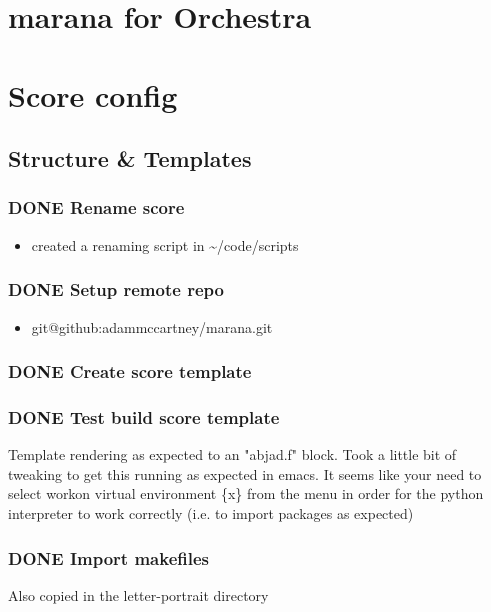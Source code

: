 \documentclass[11pt]{article}
\author{adam}
\date{\today}
\title{}
\begin{document}
\tableofcontents

\section{marana for Orchestra}
\label{sec:org8f78d0e}

\section{Score config}
\label{sec:org388cfac}

\subsection{Structure \& Templates}
\label{sec:org8746cfe}
\subsubsection{{\bfseries\sffamily DONE} Rename score}
\label{sec:org50300dd}
\begin{itemize}
\item created a renaming script in \textasciitilde{}/code/scripts
\end{itemize}
\subsubsection{{\bfseries\sffamily DONE} Setup remote repo}
\label{sec:org61cc636}
\begin{itemize}
\item git@github:adammccartney/marana.git
\end{itemize}
\subsubsection{{\bfseries\sffamily DONE} Create score template}
\label{sec:org2c0a0b7}

\subsubsection{{\bfseries\sffamily DONE} Test build score template}
\label{sec:org54e9e8f}
Template rendering as expected to an "abjad.f" block. Took a
little bit of tweaking to get this running as expected in
emacs. It seems like your need to select workon virtual
environment \{x\} from the menu in order for the python interpreter
to work correctly (i.e. to import packages as expected)

\subsubsection{{\bfseries\sffamily DONE} Import makefiles}
\label{sec:org57caa8e}
Also copied in the letter-portrait directory
\end{document}
